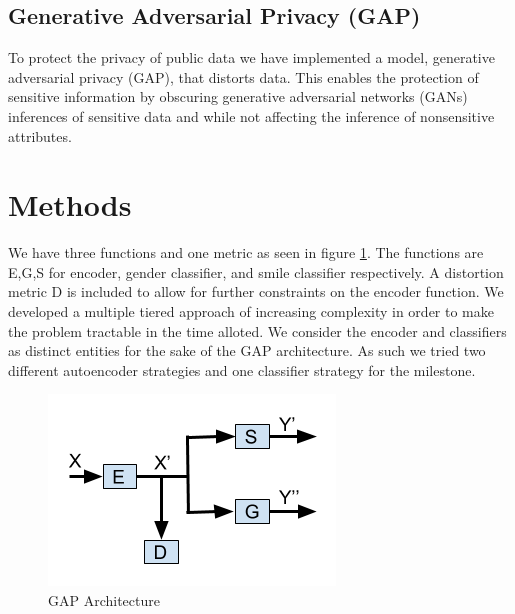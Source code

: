\documentclass[10pt,twocolumn,letterpaper]{article}
\begin{document}
\subsection{Generative Adversarial Privacy (GAP)}
To protect the privacy of public data we have implemented a model, generative adversarial privacy (GAP), that distorts data. This enables the protection of sensitive information by obscuring generative adversarial networks (GANs) inferences of sensitive data and while not affecting the inference of nonsensitive attributes.  


\section{Methods}
We have three functions and one metric as seen in figure \ref{fig:architecture}. The functions are E,G,S for encoder, gender classifier, and smile classifier respectively. A distortion metric D is included to allow for further constraints on the encoder function. We developed a multiple tiered approach of increasing complexity in order to make the problem tractable in the time alloted. We consider the encoder and classifiers as distinct entities for the sake of the GAP architecture. As such we tried two different autoencoder strategies and one classifier strategy for the milestone.

\begin{figure}[h]
\includegraphics[width=\columnwidth]{Milestone_Graphics__2_.png}
\centering
\caption{GAP Architecture}
\label{fig:architecture}
\end{figure}
\end{document}
